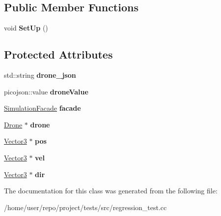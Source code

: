 \subsection*{Public Member Functions}
\begin{DoxyCompactItemize}
\item 
\mbox{\label{classRegressionTest_a812bbbe1e1e6092ec8f52f968c75e045}} 
void {\bfseries Set\+Up} ()
\end{DoxyCompactItemize}
\subsection*{Protected Attributes}
\begin{DoxyCompactItemize}
\item 
\mbox{\label{classRegressionTest_aec3ee8b943b767c631745d6f9d786d55}} 
std\+::string {\bfseries drone\+\_\+json}
\item 
\mbox{\label{classRegressionTest_a017179689dd0df95e2186a16008d9435}} 
picojson\+::value {\bfseries drone\+Value}
\item 
\mbox{\label{classRegressionTest_a71cf1b3dbbf714f220c0c127a250aba8}} 
\hyperlink{classSimulationFacade}{Simulation\+Facade} {\bfseries facade}
\item 
\mbox{\label{classRegressionTest_a7b5057b64f6b43dfc047cec451e0a565}} 
\hyperlink{classDrone}{Drone} $\ast$ {\bfseries drone}
\item 
\mbox{\label{classRegressionTest_a3e1df12225f18ef36b63de648dabfd54}} 
\hyperlink{classVector3}{Vector3} $\ast$ {\bfseries pos}
\item 
\mbox{\label{classRegressionTest_a99c20b5fe5b907bddde68dd1ba1fba27}} 
\hyperlink{classVector3}{Vector3} $\ast$ {\bfseries vel}
\item 
\mbox{\label{classRegressionTest_a71c0065b3c68856c1cd81177423e06e5}} 
\hyperlink{classVector3}{Vector3} $\ast$ {\bfseries dir}
\end{DoxyCompactItemize}


The documentation for this class was generated from the following file\+:\begin{DoxyCompactItemize}
\item 
/home/user/repo/project/tests/src/regression\+\_\+test.\+cc\end{DoxyCompactItemize}
